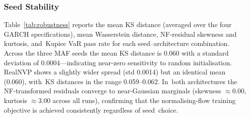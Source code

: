 \documentclass[risks,article,accept,pdftex,moreauthors]{Definitions/mdpi}
\begin{document}
\subsubsection{Seed Stability} 
Table~\ref{tab:robustness} reports the mean KS distance (averaged over the four GARCH specifications), mean Wasserstein distance, NF-residual skewness and kurtosis, and~Kupiec VaR pass rate for each seed--architecture combination. Across the three MAF seeds the mean KS distance is 0.060 with a standard deviation of 0.0004---indicating near-zero sensitivity to random initialisation. RealNVP shows a slightly wider spread (std 0.0014) but an identical mean (0.060), with~KS distances in the range 0.059--0.062. In~both architectures the NF-transformed residuals converge to near-Gaussian marginals (skewness $\approx 0.00$, kurtosis $\approx 3.00$ across all runs), confirming that the normalising-flow training objective is achieved consistently regardless of seed~choice.
\end{document}
